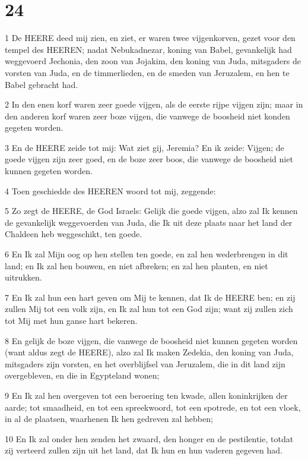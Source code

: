 \chapter{24}

\par 1 De HEERE deed mij zien, en ziet, er waren twee vijgenkorven, gezet voor den tempel des HEEREN; nadat Nebukadnezar, koning van Babel, gevankelijk had weggevoerd Jechonia, den zoon van Jojakim, den koning van Juda, mitsgaders de vorsten van Juda, en de timmerlieden, en de smeden van Jeruzalem, en hen te Babel gebracht had.
\par 2 In den enen korf waren zeer goede vijgen, als de eerste rijpe vijgen zijn; maar in den anderen korf waren zeer boze vijgen, die vanwege de boosheid niet konden gegeten worden.
\par 3 En de HEERE zeide tot mij: Wat ziet gij, Jeremia? En ik zeide: Vijgen; de goede vijgen zijn zeer goed, en de boze zeer boos, die vanwege de boosheid niet kunnen gegeten worden.
\par 4 Toen geschiedde des HEEREN woord tot mij, zeggende:
\par 5 Zo zegt de HEERE, de God Israels: Gelijk die goede vijgen, alzo zal Ik kennen de gevankelijk weggevoerden van Juda, die Ik uit deze plaats naar het land der Chaldeen heb weggeschikt, ten goede.
\par 6 En Ik zal Mijn oog op hen stellen ten goede, en zal hen wederbrengen in dit land; en Ik zal hen bouwen, en niet afbreken; en zal hen planten, en niet uitrukken.
\par 7 En Ik zal hun een hart geven om Mij te kennen, dat Ik de HEERE ben; en zij zullen Mij tot een volk zijn, en Ik zal hun tot een God zijn; want zij zullen zich tot Mij met hun ganse hart bekeren.
\par 8 En gelijk de boze vijgen, die vanwege de boosheid niet kunnen gegeten worden (want aldus zegt de HEERE), alzo zal Ik maken Zedekia, den koning van Juda, mitsgaders zijn vorsten, en het overblijfsel van Jeruzalem, die in dit land zijn overgebleven, en die in Egypteland wonen;
\par 9 En Ik zal hen overgeven tot een beroering ten kwade, allen koninkrijken der aarde; tot smaadheid, en tot een spreekwoord, tot een spotrede, en tot een vloek, in al de plaatsen, waarhenen Ik hen gedreven zal hebben;
\par 10 En Ik zal onder hen zenden het zwaard, den honger en de pestilentie, totdat zij verteerd zullen zijn uit het land, dat Ik hun en hun vaderen gegeven had.


